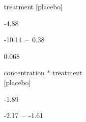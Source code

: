 \documentclass[
  letterpaper,
  DIV=11,
  numbers=noendperiod]{scrartcl}
\begin{document}
\begin{table}
\begin{minipage}[t]{\linewidth}
{treatment {[}placebo{]}

}

\end{minipage}%
\newline
\begin{minipage}[t]{\linewidth}

{\centering 

-4.88

}

\end{minipage}%
\newline
\begin{minipage}[t]{\linewidth}

{\centering 

-10.14~--~0.38

}

\end{minipage}%
\newline
\begin{minipage}[t]{\linewidth}

{\centering 

0.068

}

\end{minipage}%
\newline
\begin{minipage}[t]{\linewidth}

{\centering 

concentration * treatment\\
{[}placebo{]}

}

\end{minipage}%
\newline
\begin{minipage}[t]{\linewidth}

{\centering 

-1.89

}

\end{minipage}%
\newline
\begin{minipage}[t]{\linewidth}

{\centering 

-2.17~--~-1.61

}

\end{minipage}%
\newline
\begin{minipage}[t]{\linewidth}

{\centering 

}
\end{minipage}
\end{table}
\end{document}
